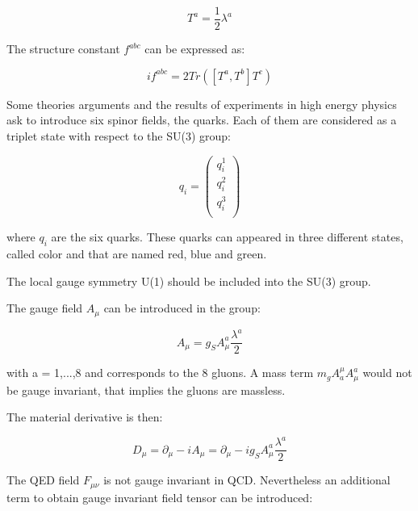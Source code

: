     \begin{equation}
        T^a = \frac{1}{2}\lambda^a
    \end{equation}

    The structure constant $f^{abc}$ can be expressed as:

    \begin{equation}
        if^{abc} = 2 Tr([T^a,T^b]T^c)
    \end{equation}
     
    Some theories arguments and the results of experiments in high energy physics ask to introduce six spinor fields, the quarks.
    Each of them are considered as a triplet state with respect to the SU(3) group:

    \begin{equation}
      q_i = 
        \begin{pmatrix}
          q_i^1 \\
          q_i^2 \\
          q_i^3 \\
        \end{pmatrix}
     \end{equation}
    
    where $q_i$ are the six quarks.
    These quarks can appeared in three different states, called color and that are named red, blue and green.

    The local gauge symmetry U(1) should be included into the SU(3) group.
    
    The gauge field $A_{\mu}$ can be introduced in the group:
    
    \begin{equation}
      A_{\mu} = g_S A^a_{\mu}\frac{\lambda^a}{2}
    \end{equation}
     
    with a = 1,...,8 and corresponds to the 8 gluons.
    A mass term  $m_g A^{\mu}_a A^a_{\mu}$ would not be gauge invariant, that implies the gluons are massless.

    The material derivative is then:

    \begin{equation}
      D_{\mu} = \partial_{\mu} - i A_{\mu} = \partial_{\mu} - i g_S A^a_{\mu} \frac{\lambda^a}{2}
    \end{equation}

    The QED field $F_{\mu \nu}$ is not gauge invariant in QCD.
    Nevertheless an additional term to obtain gauge invariant field tensor can be introduced:
    
